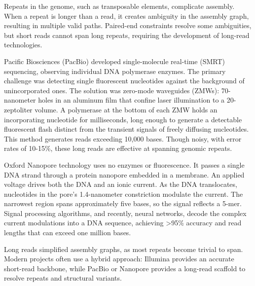 Repeats in the genome, such as transposable elements, complicate assembly. When a repeat is longer than a read, it creates ambiguity in the assembly graph, resulting in multiple valid paths. Paired-end constraints resolve some ambiguities, but short reads cannot span long repeats, requiring the development of long-read technologies.

Pacific Biosciences (PacBio) developed single-molecule real-time (SMRT) sequencing, observing individual DNA polymerase enzymes. The primary challenge was detecting single fluorescent nucleotides against the background of unincorporated ones. The solution was zero-mode waveguides (ZMWs): 70-nanometer holes in an aluminum film that confine laser illumination to a 20-zeptoliter volume. A polymerase at the bottom of each ZMW holds an incorporating nucleotide for milliseconds, long enough to generate a detectable fluorescent flash distinct from the transient signals of freely diffusing nucleotides. This method generates reads exceeding 10,000 bases. Though noisy, with error rates of 10-15\%, these long reads are effective at spanning genomic repeats.

Oxford Nanopore technology uses no enzymes or fluorescence. It passes a single DNA strand through a protein nanopore embedded in a membrane. An applied voltage drives both the DNA and an ionic current. As the DNA translocates, nucleotides in the pore's 1.4-nanometer constriction modulate the current. The narrowest region spans approximately five bases, so the signal reflects a 5-mer. Signal processing algorithms, and recently, neural networks, decode the complex current modulations into a DNA sequence, achieving >95\% accuracy and read lengths that can exceed one million bases.

Long reads simplified assembly graphs, as most repeats become trivial to span. Modern projects often use a hybrid approach: Illumina provides an accurate short-read backbone, while PacBio or Nanopore provides a long-read scaffold to resolve repeats and structural variants.

\newpage

